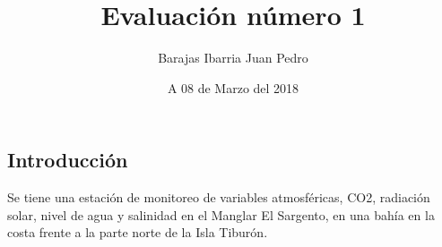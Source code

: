 \documentclass[11pt]{article}
\title{Evaluación número 1}
\author{Barajas Ibarria Juan Pedro}
\date{A 08 de Marzo del 2018}
\begin{document}
    
    
    \maketitle
    \begin{center}
    \end{center}
	\begin{center}
    \section*{Introducción}
    \end{center}
    Se tiene una estación de monitoreo de variables atmosféricas, CO2, radiación solar, nivel de agua y salinidad en el Manglar El Sargento, en una bahía en la costa frente a la parte norte de la Isla Tiburón.
    
\end{document}
